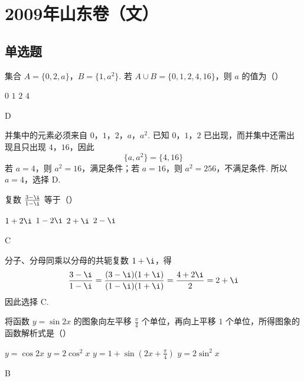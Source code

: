 \chapter{2009年山东卷（文）}

\section{单选题}

\begin{problem}
集合 \(A = \{0, 2, a\}\)，\(B = \{1, a^2\}\). 若 \(A \cup B = \{0, 1, 2, 4, 16\}\)，则 \(a\) 的值为（\quad）

\choices
    {\(0\)}
    {\(1\)}
    {\(2\)}
    {\(4\)}
\end{problem}

\begin{answer}
D
\end{answer}

\begin{solution}
并集中的元素必须来自 \(0\)，\(1\)，\(2\)，\(a\)，\(a^2\). 已知 \(0\)，\(1\)，\(2\) 已出现，而并集中还需出现且只出现 \(4\)，\(16\)，因此
\[
\{a,a^2\}=\{4,16\}
\]
若 \(a=4\)，则 \(a^2=16\)，满足条件；若 \(a=16\)，则 \(a^2=256\)，不满足条件. 所以 \(a=4\)，选择 D.
\end{solution}

\begin{problem}
复数 \(\frac{3 - \i}{1 - \i}\) 等于（\quad）

\choices
    {\(1 + 2\i\)}
    {\(1 - 2\i\)}
    {\(2 + \i\)}
    {\(2 - \i\)}
\end{problem}

\begin{answer}
C
\end{answer}

\begin{solution}
分子、分母同乘以分母的共轭复数 \(1+\i\)，得
\[
\frac{3-\i}{1-\i}=\frac{(3-\i)(1+\i)}{(1-\i)(1+\i)}=\frac{4+2\i}{2}=2+\i
\]
因此选择 C.
\end{solution}

\begin{problem}
将函数 \( y = \sin 2x \) 的图象向左平移 \( \frac{\pi}{4} \) 个单位，再向上平移 \(1\) 个单位，所得图象的函数解析式是（\quad）

\choices
    {\(y = \cos 2x\)}
    {\(y = 2\cos^2 x\)}
    {\(y = 1 + \sin \left(2x + \frac{\pi}{4}\right)\)}
    {\(y = 2\sin^2 x\)}
\end{problem}

\begin{answer}
B
\end{answer}

